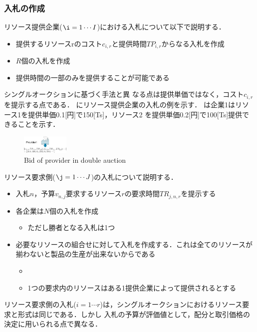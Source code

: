 \documentclass{ujarticle}
\begin{document}
\subsubsection{入札の作成}
リソース提供企業($\i=1 \cdots I$)における入札について以下で説明する．
\begin{itemize}
\item {提供するリソースrのコスト$c_{i,r}$と提供時間$TP_{i,r}$からなる入札を作成 }
\item {$R$個の入札を作成}
\item {提供時間の一部のみを提供することが可能である}
\end{itemize}
シングルオークションに基づく手法と異
なる点は提供単価ではなく，コスト$c_{i,r}$を提示する点である．
にリソース提供企業の入札の例を示す．
は企業1はリソース1を提供単価0.1[円]で150[Ts]，リソース2
を提供単価0.2[円]で100[Ts]提供できることを示す．
\begin{figure}[H]
  \centering
  \includegraphics[width=0.2\textwidth]{bid-provider-double.pdf} 
  \caption{Bid of provider in double auction}
  \label{fig:bid-provider-double}
\end{figure} 
リソース要求側($\j=1 \cdots J$)の入札について説明する．
\begin{itemize}
\item {入札$n$，予算$v_{n,j}$要求するリソース$r$の要求時間$TR_{j,n,r}$を提示する} 
\item {各企業は$N$個の入札を作成}
  \begin{itemize}
  \item {ただし勝者となる入札は1つ} 
  \end{itemize}
\item {必要なリソースの組合せに対して入札を作成する．これは全てのリソースが揃わないと製品の生産が出来ないからである}
  \begin{itemize}
  \item {}
    \item {1つの要求内のリソースはある1提供企業によって提供されるとする}
    \end{itemize}
\end{itemize}
リソース要求側の入札($i=1 \cdots r$)は，シングルオークションにおけるリソース要求と形式は同じである．しかし
入札の予算が評価値として，配分と取引価格の決定に用いられる点で異なる．
\end{document}
